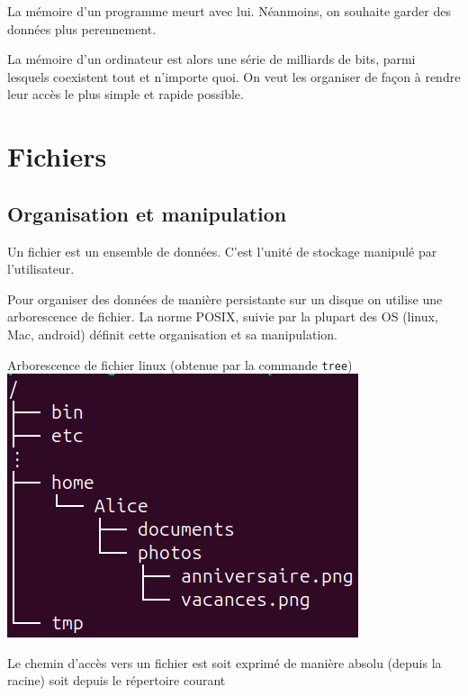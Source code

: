 
La mémoire d'un programme meurt avec lui. Néanmoins, on souhaite garder des données plus perennement.

La mémoire d'un ordinateur est alors une série de milliards de bits, parmi lesquels coexistent tout et n'importe quoi. On veut les organiser de façon à rendre leur accès le plus simple et rapide possible.

\section{Fichiers}

\subsection{Organisation et manipulation}

\begin{definition}
	Un fichier est un ensemble de données. C'est l'unité de stockage manipulé par l'utilisateur.
\end{definition}

\begin{definition}
	Pour organiser des données de manière persistante sur un disque on utilise une arborescence de fichier. La norme POSIX, suivie par la plupart des OS (linux, Mac, android) définit cette organisation et sa manipulation.
\end{definition}

\begin{example}
	Arborescence de fichier linux (obtenue par la commande \texttt{tree})\\
	\includegraphics[width=0.4\linewidth]{lecon/21-fichier/arborescence.png}
\end{example}

\begin{definition}
	Le chemin d'accès vers un fichier est soit exprimé de manière absolu (depuis la racine) soit depuis le répertoire courant
\end{definition}

